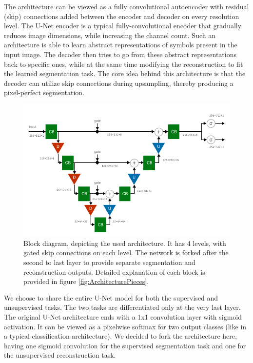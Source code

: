 The architecture can be viewed as a fully convolutional autoencoder with residual (skip) connections added between the encoder and decoder on every resolution level. The U-Net encoder is a typical fully-convolutional encoder that gradually reduces image dimensions, while increasing the channel count. Such an architecture is able to learn abstract representations of symbols present in the input image. The decoder then tries to go from these abstract representations back to specific ones, while at the same time modifying the reconstruction to fit the learned segmentation task. The core idea behind this architecture is that the decoder can utilize skip connections during upsampling, thereby producing a pixel-perfect segmentation.

\begin{figure}[ht]
    \centering
    \includegraphics[width=140mm]{../img/architecture-complete.pdf}
    \caption{Block diagram, depicting the used architecture. It has 4 levels, with gated skip connections on each level. The network is forked after the second to last layer to provide separate segmentation and reconstruction outputs. Detailed explanation of each block is provided in figure \ref{fig:ArchitecturePieces}.}
    \label{fig:ArchitectureCombined}
\end{figure}

We choose to share the entire U-Net model for both the supervised and unsupervised tasks. The two tasks are differentiated only at the very last layer. The original U-Net architecture ends with a 1x1 convolution layer with sigmoid activation. It can be viewed as a pixelwise softmax for two output classes (like in a typical classification architecture). We decided to fork the architecture here, having one sigmoid convolution for the supervised segmentation task and one for the unsupervised reconstruction task.

